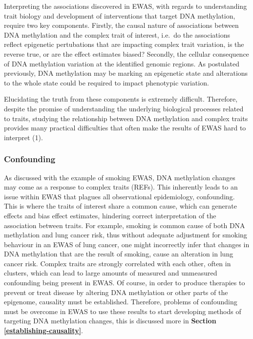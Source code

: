 \documentclass[11pt,oneside]{bristolthesis}
\begin{document}
Interpreting the associations discovered in EWAS, with regards to understanding trait biology and development of interventions that target DNA methylation, require two key components. Firstly, the causal nature of associations between DNA methylation and the complex trait of interest, i.e.~do the associations reflect epigenetic pertubations that are impacting complex trait variation, is the reverse true, or are the effect estimates biased? Secondly, the cellular consequence of DNA methylation variation at the identified genomic regions. As postulated previously, DNA methylation may be marking an epigenetic state and alterations to the whole state could be required to impact phenotypic variation.

Elucidating the truth from these components is extremely difficult. Therefore, despite the promise of understanding the underlying biological processes related to traits, studying the relationship between DNA methylation and complex traits provides many practical difficulties that often make the results of EWAS hard to interpret (1).

\hypertarget{confounding}{%
\subsubsection{Confounding}\label{confounding}}

As discussed with the example of smoking EWAS, DNA methylation changes may come as a response to complex traits (REFs). This inherently leads to an issue within EWAS that plagues all observational epidemiology, confounding. This is where the traits of interest share a common cause, which can generate effects and bias effect estimates, hindering correct interpretation of the association between traits. For example, smoking is common cause of both DNA methylation and lung cancer risk, thus without adequate adjustment for smoking behaviour in an EWAS of lung cancer, one might incorrectly infer that changes in DNA methylation that are the result of smoking, cause an alteration in lung cancer risk. Complex traits are strongly correlated with each other, often in clusters, which can lead to large amounts of measured and unmeasured confounding being present in EWAS. Of course, in order to produce therapies to prevent or treat disease by altering DNA methylation or other parts of the epigenome, causality must be established. Therefore, problems of confounding must be overcome in EWAS to use these results to start developing methods of targeting DNA methylation changes, this is discussed more in \textbf{Section \ref{establishing-causality}}.
\end{document}
